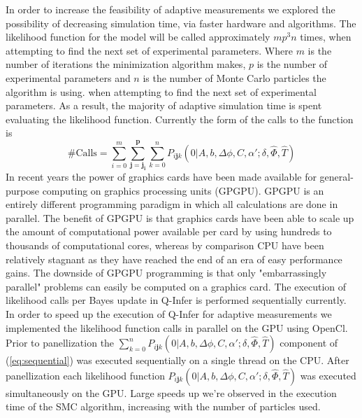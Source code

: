 In order to increase the feasibility of adaptive measurements we explored the possibility of decreasing simulation time, via faster hardware and algorithms. The likelihood function for the model will be called approximately $mp^3n$ times, when attempting to find the next set of experimental parameters. Where $m$ is the number of iterations the minimization algorithm makes, $p$ is the number of experimental parameters and $n$ is the number of Monte Carlo particles the algorithm is using. when attempting to find the next set of experimental parameters. As a result, the majority of adaptive simulation time is spent evaluating the likelihood function. Currently the form of the calls to the function is
\begin{equation}
\text{\# Calls} = \sum \limits_{i=0}^m \sum \limits_{\mathbf{j}=\mathbf{j_i}}^\mathbf{p} \sum \limits_{k=0}^n P_{i\mathbf{j}k}(0|A,b,\Delta\phi,C,\alpha';\delta,\hat{\Phi},\hat{T})
\label{eq:sequential}
\end{equation} 
In recent years the power of graphics cards have been made available for general-purpose computing on graphics processing units (GPGPU). GPGPU is an entirely different programming paradigm in which all calculations are done in parallel. The benefit of GPGPU is that graphics cards have been able to scale up the amount of computational power available per card by using hundreds to thousands of computational cores, whereas by comparison CPU have been relatively stagnant as they have reached the end of an era of easy performance gains.\cite{gpuvscpu} The downside of GPGPU programming is that only "embarrassingly parallel" problems can easily be computed on a graphics card. The execution of likelihood calls per Bayes update in Q-Infer is performed sequentially currently. In order to speed up the execution of Q-Infer for adaptive measurements we implemented the likelihood function calls in parallel on the GPU using OpenCl.\cite{opencl} Prior to panellization the $\sum \limits_{k=0}^n P_{i\mathbf{j}k}(0|A,b,\Delta\phi,C,\alpha';\delta,\hat{\Phi},\hat{T})$ component of (\ref{eq:sequential}) was executed sequentially on a single thread on the CPU. After panellization each likelihood function $P_{i\mathbf{j}k}(0|A,b,\Delta\phi,C,\alpha';\delta,\hat{\Phi},\hat{T})$ was executed simultaneously on the GPU. Large speeds up we're observed in the execution time of the SMC algorithm, increasing with the number of particles used. 